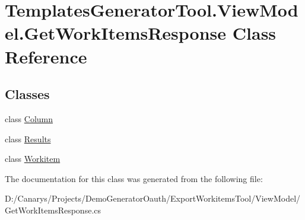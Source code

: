 \hypertarget{class_templates_generator_tool_1_1_view_model_1_1_get_work_items_response}{}\section{Templates\+Generator\+Tool.\+View\+Model.\+Get\+Work\+Items\+Response Class Reference}
\label{class_templates_generator_tool_1_1_view_model_1_1_get_work_items_response}
\subsection*{Classes}
\begin{DoxyCompactItemize}
\item 
class \mbox{\hyperlink{class_templates_generator_tool_1_1_view_model_1_1_get_work_items_response_1_1_column}{Column}}
\item 
class \mbox{\hyperlink{class_templates_generator_tool_1_1_view_model_1_1_get_work_items_response_1_1_results}{Results}}
\item 
class \mbox{\hyperlink{class_templates_generator_tool_1_1_view_model_1_1_get_work_items_response_1_1_workitem}{Workitem}}
\end{DoxyCompactItemize}


The documentation for this class was generated from the following file\+:\begin{DoxyCompactItemize}
\item 
D\+:/\+Canarys/\+Projects/\+Demo\+Generator\+Oauth/\+Export\+Workitems\+Tool/\+View\+Model/Get\+Work\+Items\+Response.\+cs\end{DoxyCompactItemize}
